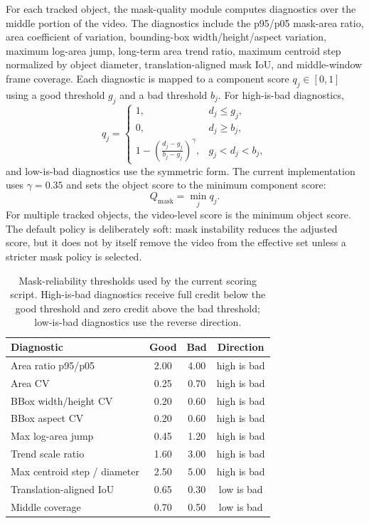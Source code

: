 \documentclass{article}
\begin{document}
For each tracked object, the mask-quality module computes diagnostics over the middle portion of the video.
The diagnostics include the p95/p05 mask-area ratio, area coefficient of variation, bounding-box width/height/aspect variation, maximum log-area jump, long-term area trend ratio, maximum centroid step normalized by object diameter, translation-aligned mask IoU, and middle-window frame coverage.
Each diagnostic is mapped to a component score $q_j\in[0,1]$ using a good threshold $g_j$ and a bad threshold $b_j$.
For high-is-bad diagnostics,
\begin{equation}
q_j =
\begin{cases}
1, & d_j \le g_j,\\
0, & d_j \ge b_j,\\
1 - \left(\frac{d_j-g_j}{b_j-g_j}\right)^\gamma, & g_j < d_j < b_j,
\end{cases}
\end{equation}
and low-is-bad diagnostics use the symmetric form.
The current implementation uses $\gamma=0.35$ and sets the object score to the minimum component score:
\begin{equation}
Q_{\mathrm{mask}} = \min_j q_j.
\end{equation}
For multiple tracked objects, the video-level score is the minimum object score.
The default policy is deliberately soft: mask instability reduces the adjusted score, but it does not by itself remove the video from the effective set unless a stricter mask policy is selected.

\begin{table}[H]
\centering
\scriptsize
\caption{Mask-reliability thresholds used by the current scoring script. High-is-bad diagnostics receive full credit below the good threshold and zero credit above the bad threshold; low-is-bad diagnostics use the reverse direction.}
\label{tab:mask-thresholds}
\begin{tabular}{lccc}
\toprule
Diagnostic & Good & Bad & Direction \\
\midrule
Area ratio p95/p05 & 2.00 & 4.00 & high is bad \\
Area CV & 0.25 & 0.70 & high is bad \\
BBox width/height CV & 0.20 & 0.60 & high is bad \\
BBox aspect CV & 0.20 & 0.60 & high is bad \\
Max log-area jump & 0.45 & 1.20 & high is bad \\
Trend scale ratio & 1.60 & 3.00 & high is bad \\
Max centroid step / diameter & 2.50 & 5.00 & high is bad \\
Translation-aligned IoU & 0.65 & 0.30 & low is bad \\
Middle coverage & 0.70 & 0.50 & low is bad \\
\bottomrule
\end{tabular}
\end{table}
\end{document}
